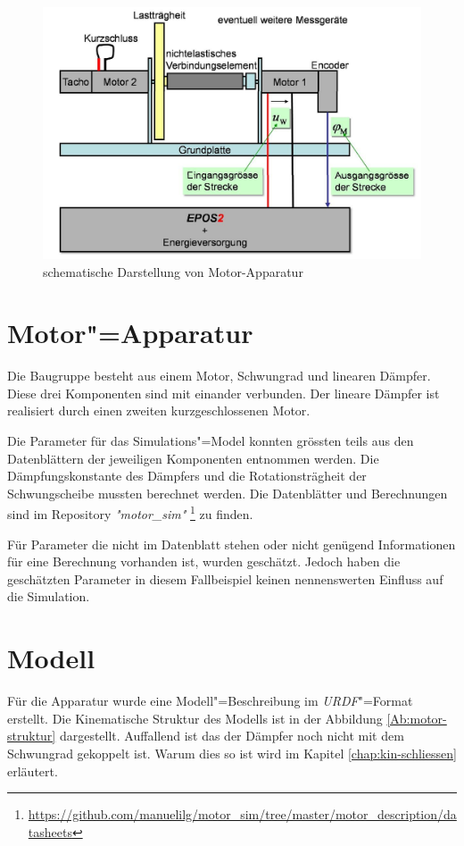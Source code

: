 \begin{figure}[ht!]
	\centering
	\includegraphics[width=14.5cm]{images/motor_baugruppe.png} %
	\caption{schematische Darstellung von Motor-Apparatur}
	\label{Ab:motor-baugruppe}
\end{figure}

\section{Motor"=Apparatur}
Die Baugruppe besteht aus einem Motor, Schwungrad und linearen Dämpfer.
Diese drei Komponenten sind mit einander verbunden.
Der lineare Dämpfer ist realisiert durch einen zweiten kurzgeschlossenen Motor.

Die Parameter für das Simulations"=Model konnten grössten teils aus den Datenblättern der jeweiligen Komponenten entnommen werden. 
Die Dämpfungskonstante des Dämpfers und die Rotationsträgheit der Schwungscheibe mussten berechnet werden.
Die Datenblätter und Berechnungen sind im Repository \textit{\textsc{"}motor\_sim\textit{"}} \footnote{\url{https://github.com/manuelilg/motor\_sim/tree/master/motor\_description/datasheets}} zu finden. 

Für Parameter die nicht im Datenblatt stehen oder nicht genügend Informationen für eine Berechnung vorhanden ist, wurden geschätzt.
Jedoch haben die geschätzten Parameter in diesem Fallbeispiel keinen nennenswerten Einfluss auf die Simulation.


\section{Modell}
Für die Apparatur wurde eine Modell"=Beschreibung im \textit{URDF}"=Format erstellt.
Die Kinematische Struktur des Modells ist in der Abbildung \ref{Ab:motor-struktur} dargestellt.
Auffallend ist das der Dämpfer noch nicht mit dem Schwungrad gekoppelt ist.
Warum dies so ist wird im Kapitel \ref{chap:kin-schliessen} erläutert.

